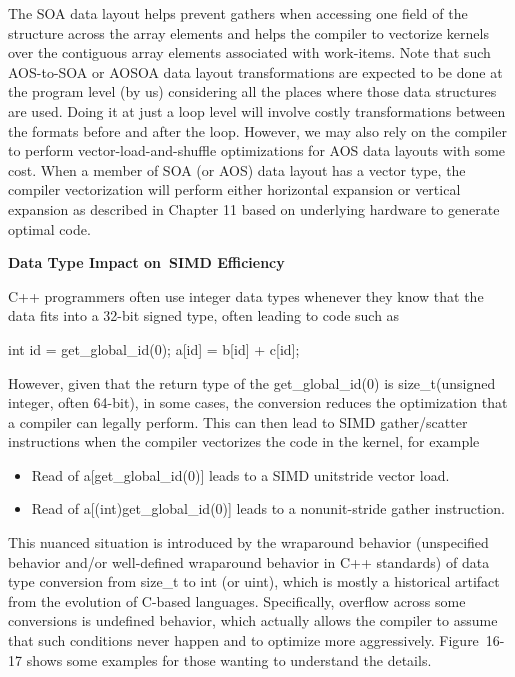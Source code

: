 The SOA data layout helps prevent gathers when accessing one field of the structure across the array elements and helps the compiler to vectorize kernels over the contiguous array elements associated with work-items. Note that such AOS-to-SOA or AOSOA data layout transformations are expected to be done at the program level (by us) considering all the places where those data structures are used. Doing it at just a loop level will involve costly transformations between the formats before and after the loop. However, we may also rely on the compiler to perform vector-load-and-shuffle optimizations for AOS data layouts with some cost. When a member of SOA (or AOS) data layout has a vector type, the compiler vectorization will perform either horizontal expansion or vertical expansion as described in Chapter 11 based on underlying hardware to generate optimal code.\par

\hspace*{\fill} \par %
\textbf{Data Type Impact on SIMD Efficiency}

C++ programmers often use integer data types whenever they know that the data fits into a 32-bit signed type, often leading to code such as\par

\begin{tcolorbox}[colback=white,colframe=black]
int id = get\_global\_id(0); a[id] = b[id] + c[id];
\end{tcolorbox}

However, given that the return type of the get\_global\_id(0) is size\_t(unsigned integer, often 64-bit), in some cases, the conversion reduces the optimization that a compiler can legally perform. This can then lead to SIMD gather/scatter instructions when the compiler vectorizes the code in the kernel, for example

\begin{itemize}
	\item Read of a[get\_global\_id(0)] leads to a SIMD unitstride vector load.
	\item Read of a[(int)get\_global\_id(0)] leads to a nonunit-stride gather instruction.
\end{itemize}

This nuanced situation is introduced by the wraparound behavior (unspecified behavior and/or well-defined wraparound behavior in C++ standards) of data type conversion from size\_t to int (or uint), which is mostly a historical artifact from the evolution of C-based languages. Specifically, overflow across some conversions is undefined behavior, which actually allows the compiler to assume that such conditions never happen and to optimize more aggressively. Figure 16-17 shows some examples for those wanting to understand the details.\par

